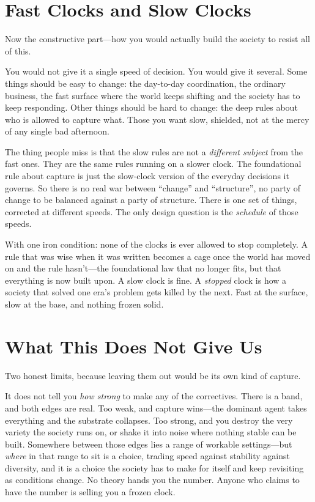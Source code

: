 \documentclass[11pt, a4paper]{report}
\begin{document}

\section{Fast Clocks and Slow Clocks}

Now the constructive part---how you would actually build the society to resist all of this.

You would not give it a single speed of decision. You would give it several. Some things should be easy to change: the day-to-day coordination, the ordinary business, the fast surface where the world keeps shifting and the society has to keep responding. Other things should be hard to change: the deep rules about who is allowed to capture what. Those you want slow, shielded, not at the mercy of any single bad afternoon.

The thing people miss is that the slow rules are not a \textit{different subject} from the fast ones. They are the same rules running on a slower clock. The foundational rule about capture is just the slow-clock version of the everyday decisions it governs. So there is no real war between \enquote{change} and \enquote{structure}, no party of change to be balanced against a party of structure. There is one set of things, corrected at different speeds. The only design question is the \textit{schedule} of those speeds.

With one iron condition: none of the clocks is ever allowed to stop completely. A rule that was wise when it was written becomes a cage once the world has moved on and the rule hasn't---the foundational law that no longer fits, but that everything is now built upon. A slow clock is fine. A \textit{stopped} clock is how a society that solved one era's problem gets killed by the next. Fast at the surface, slow at the base, and nothing frozen solid.


\section{What This Does Not Give Us}

Two honest limits, because leaving them out would be its own kind of capture.

It does not tell you \textit{how strong} to make any of the correctives. There is a band, and both edges are real. Too weak, and capture wins---the dominant agent takes everything and the substrate collapses. Too strong, and you destroy the very variety the society runs on, or shake it into noise where nothing stable can be built. Somewhere between those edges lies a range of workable settings---but \textit{where} in that range to sit is a choice, trading speed against stability against diversity, and it is a choice the society has to make for itself and keep revisiting as conditions change. No theory hands you the number. Anyone who claims to have the number is selling you a frozen clock.
\end{document}
